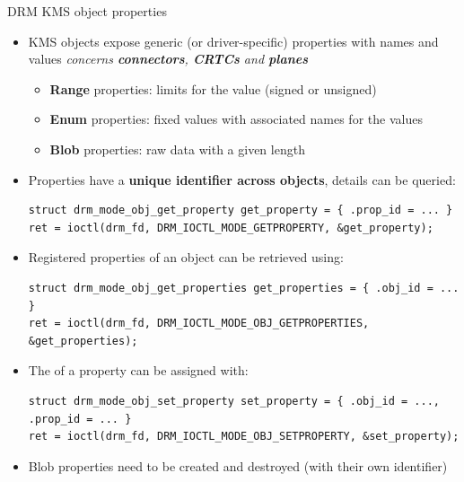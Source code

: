 \begin{frame}[fragile]{DRM KMS object properties}
  \begin{itemize}
  \item KMS objects expose generic (or driver-specific) properties with names and values
  \textit{concerns \textbf{connectors}, \textbf{CRTCs} and \textbf{planes}}
    \begin{itemize}
    \item \textbf{Range} properties: limits for the value (signed or unsigned)
    \item \textbf{Enum} properties: fixed values with associated names for the values
    \item \textbf{Blob} properties: raw data with a given length
    \end{itemize}
  \item Properties have a \textbf{unique identifier across objects}, details can be queried:
  \begin{verbatim}
struct drm_mode_obj_get_property get_property = { .prop_id = ... }
ret = ioctl(drm_fd, DRM_IOCTL_MODE_GETPROPERTY, &get_property);
  \end{verbatim}
  \item Registered properties of an object can be retrieved using:
  \begin{verbatim}
struct drm_mode_obj_get_properties get_properties = { .obj_id = ... }
ret = ioctl(drm_fd, DRM_IOCTL_MODE_OBJ_GETPROPERTIES, &get_properties);
  \end{verbatim}
  \item The  of a property can be assigned with:
  \begin{verbatim}
struct drm_mode_obj_set_property set_property = { .obj_id = ..., .prop_id = ... }
ret = ioctl(drm_fd, DRM_IOCTL_MODE_OBJ_SETPROPERTY, &set_property);
  \end{verbatim}
  \item Blob properties need to be created and destroyed (with their own identifier)
  \end{itemize}
\end{frame}

